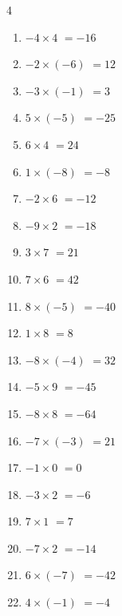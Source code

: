 \begin{multicols}{4}
\begin{enumerate}
  \item $-4\times 4$
        $=-16$

  \item $-2\times (-6)$
        $=12$

  \item $-3\times (-1)$
        $=3$

\columnbreak %

  \item $5\times (-5)$
        $=-25$

  \item $6\times 4$
        $=24$

  \item $1\times (-8)$
        $=-8$

  \item $-2\times 6$
        $=-12$

  \item $-9\times 2$
        $=-18$

  \item $3\times 7$
        $=21$

  \item $7\times 6$
        $=42$

  \item $8\times (-5)$
        $=-40$

  \item $1\times 8$
        $=8$

  \item $-8\times (-4)$
        $=32$

  \item $-5\times 9$
        $=-45$

  \item $-8\times 8$
        $=-64$

  \item $-7\times (-3)$
        $=21$

  \item $-1\times 0$
        $=0$

  \item $-3\times 2$
        $=-6$

  \item $7\times 1$
        $=7$

  \item $-7\times 2$
        $=-14$

  \item $6\times (-7)$
        $=-42$

  \item $4\times (-1)$
        $=-4$


\end{enumerate}
\end{multicols}
